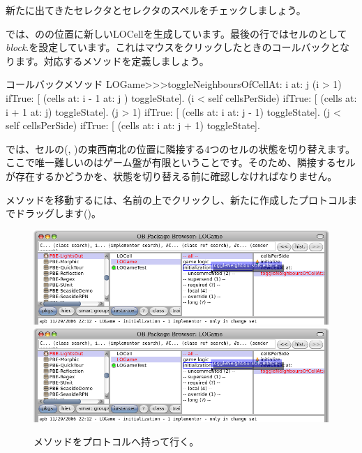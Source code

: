 \documentclass[a4paper,10pt,twoside]{book}
\begin{document}

新たに出てきたセレクタとセレクタのスペルをチェックしましょう。

 では、のの位置に新しいLOCellを生成しています。最後の行ではセルのとして\emph{block}\mbox{.}を設定しています。これはマウスをクリックしたときのコールバックとなります。対応するメソッドを定義しましょう。

\begin{method}[toggleNeighboursOfCellAt:at:]{コールバックメソッド}
LOGame>>>toggleNeighboursOfCellAt: i at: j
   (i > 1) ifTrue: [ (cells at: i - 1 at: j ) toggleState].
   (i < self cellsPerSide) ifTrue: [ (cells at: i + 1 at: j) toggleState].
   (j > 1) ifTrue: [ (cells at: i  at: j - 1) toggleState].
   (j < self cellsPerSide) ifTrue: [ (cells at: i at: j + 1) toggleState].
\end{method}

 では、セルの(, )の東西南北の位置に隣接する4つのセルの状態を切り替えます。ここで唯一難しいのはゲーム盤が有限ということです。そのため、隣接するセルが存在するかどうかを、状態を切り替える前に確認しなければなりません。


メソッドを移動するには、名前の上でクリックし、新たに作成したプロトコルまでドラッグします()。

\begin{figure}[htbp]
   \centering
   \ifluluelse
		{\includegraphics[width=\textwidth]{DragMethod} }
		{\includegraphics[scale=0.7]{DragMethod} }
   \caption{メソッドをプロトコルへ持って行く。}
\end{figure}
\end{document}
